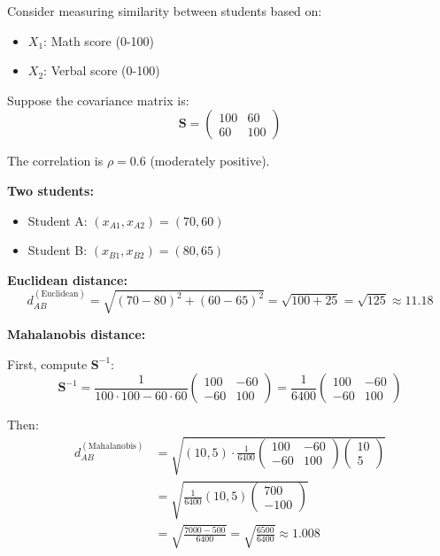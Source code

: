 \documentclass[11pt]{article}
\begin{document}
Consider measuring similarity between students based on:
\begin{itemize}
    \item $X_1$: Math score (0-100)
    \item $X_2$: Verbal score (0-100)
\end{itemize}

Suppose the covariance matrix is:
$$\mathbf{S} = \begin{pmatrix} 100 & 60 \\ 60 & 100 \end{pmatrix}$$

The correlation is $\rho = 0.6$ (moderately positive).

\textbf{Two students:}
\begin{itemize}
    \item Student A: $(x_{A1}, x_{A2}) = (70, 60)$
    \item Student B: $(x_{B1}, x_{B2}) = (80, 65)$
\end{itemize}

\textbf{Euclidean distance:}
$$d_{AB}^{(\text{Euclidean})} = \sqrt{(70-80)^2 + (60-65)^2} = \sqrt{100 + 25} = \sqrt{125} \approx 11.18$$

\textbf{Mahalanobis distance:}

First, compute $\mathbf{S}^{-1}$:
$$\mathbf{S}^{-1} = \frac{1}{100 \cdot 100 - 60 \cdot 60} \begin{pmatrix} 100 & -60 \\ -60 & 100 \end{pmatrix} = \frac{1}{6400} \begin{pmatrix} 100 & -60 \\ -60 & 100 \end{pmatrix}$$

Then:
\begin{align*}
d_{AB}^{(\text{Mahalanobis})} &= \sqrt{(10, 5) \cdot \frac{1}{6400} \begin{pmatrix} 100 & -60 \\ -60 & 100 \end{pmatrix} \begin{pmatrix} 10 \\ 5 \end{pmatrix}} \\
&= \sqrt{\frac{1}{6400} (10, 5) \begin{pmatrix} 700 \\ -100 \end{pmatrix}} \\
&= \sqrt{\frac{7000 - 500}{6400}} = \sqrt{\frac{6500}{6400}} \approx 1.008
\end{align*}
\end{document}
